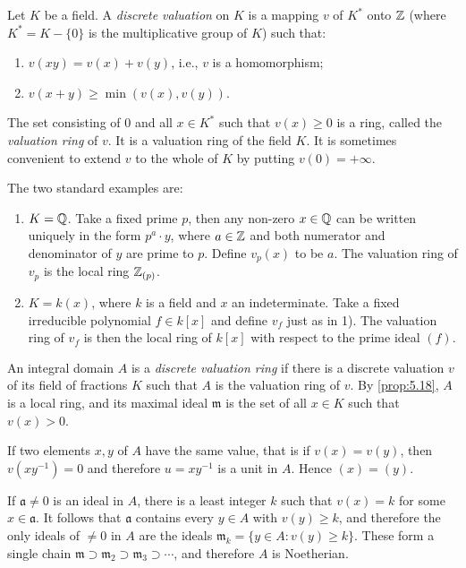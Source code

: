 Let $K$ be a field. A \emph{discrete valuation} on $K$ is a mapping $v$ of $K^*$ onto $\mathbb{Z}$ (where $K^* = K - \{0\}$ is the multiplicative group of $K$) such that:
\begin{enumerate}[1)]
    \item $v(xy) = v(x) + v(y)$, i.e., $v$ is a homomorphism;
    \item $v(x + y) \geq \min(v(x), v(y))$.
\end{enumerate}

The set consisting of $0$ and all $x \in K^*$ such that $v(x) \geq 0$ is a ring, called the \emph{valuation ring} of $v$. It is a valuation ring of the field $K$. It is sometimes convenient to extend $v$ to the whole of $K$ by putting $v(0) = +\infty$.

\begin{examples}
The two standard examples are:
\begin{enumerate}[1)]
    \item $K = \mathbb{Q}$. Take a fixed prime $p$, then any non-zero $x \in \mathbb{Q}$ can be written uniquely in the form $p^a \cdot y$, where $a \in \mathbb{Z}$ and both numerator and denominator of $y$ are prime to $p$. Define $v_p(x)$ to be $a$. The valuation ring of $v_p$ is the local ring $\mathbb{Z}_{(p)}$.
    
    \item $K = k(x)$, where $k$ is a field and $x$ an indeterminate. Take a fixed irreducible polynomial $f \in k[x]$ and define $v_f$ just as in 1). The valuation ring of $v_f$ is then the local ring of $k[x]$ with respect to the prime ideal $(f)$.
\end{enumerate}
\end{examples}

An integral domain $A$ is a \emph{discrete valuation ring} if there is a discrete valuation $v$ of its field of fractions $K$ such that $A$ is the valuation ring of $v$. By \eqref{prop:5.18}, $A$ is a local ring, and its maximal ideal $\mathfrak{m}$ is the set of all $x \in K$ such that $v(x) > 0$.

If two elements $x, y$ of $A$ have the same value, that is if $v(x) = v(y)$, then $v(xy^{-1}) = 0$ and therefore $u = xy^{-1}$ is a unit in $A$. Hence $(x) = (y)$.

If $\mathfrak{a} \neq 0$ is an ideal in $A$, there is a least integer $k$ such that $v(x) = k$ for some $x \in \mathfrak{a}$. It follows that $\mathfrak{a}$ contains every $y \in A$ with $v(y) \geq k$, and therefore the only ideals of $\neq 0$ in $A$ are the ideals $\mathfrak{m}_k = \{y \in A : v(y) \geq k\}$. These form a single chain $\mathfrak{m} \supset \mathfrak{m}_2 \supset \mathfrak{m}_3 \supset \cdots$, and therefore $A$ is Noetherian.

